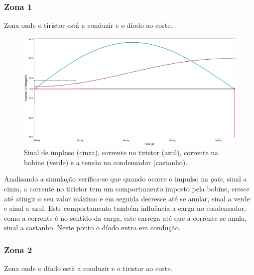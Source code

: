 \documentclass[a4paper,11pt]{article}
\numberwithin{equation}{section}
\begin{document}
\subsubsection*{Zona 1}
	Zona onde o tiristor está a conduzir e o díodo ao corte.
	
	\begin{figure}[h]
		\centering
		\includegraphics[keepaspectratio=true, scale=0.4]{img/Zona1}
		\caption{Sinal de impluso (cinza), corrente no tiristor (azul), corrente na bobine (verde) e a tensão no condensador (castanho).}
		\label{fig:figura 1}
		\vspace{-0.8em}
	\end{figure}
	
	
	Analisando a simulação verifica-se que quando ocorre o impulso na \textit{gate}, sinal a cinza, a corrente no tiristor tem um comportamento imposto pela bobine, cresce até atingir o seu valor máximo e em seguida decresce até se anular, sinal a verde e sinal a azul. Este comportamento também influência a carga no condensador, como a corrente é no sentido da carga, este carrega até que a corrente se anula, sinal a castanho. Neste ponto o díodo entra em condução.
	
	\pagebreak
	   
\subsubsection*{Zona 2}
	Zona onde o díodo está a conduzir e o tiristor ao corte. 
	
\end{document}
